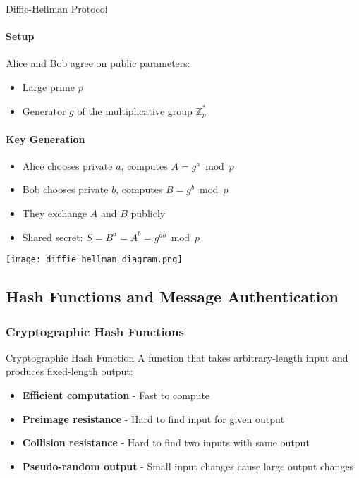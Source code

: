 \begin{KR}{Diffie-Hellman Protocol}
    \paragraph{Setup}
    Alice and Bob agree on public parameters:
    \begin{itemize}
        \item Large prime $p$
        \item Generator $g$ of the multiplicative group $\mathbb{Z}_p^*$
    \end{itemize}
    
    \paragraph{Key Generation}
    \begin{itemize}
        \item Alice chooses private $a$, computes $A = g^a \bmod p$
        \item Bob chooses private $b$, computes $B = g^b \bmod p$
        \item They exchange $A$ and $B$ publicly
        \item Shared secret: $S = B^a = A^b = g^{ab} \bmod p$
    \end{itemize}
    \texttt{[image: diffie\_hellman\_diagram.png]}
\end{KR}

\subsection{Hash Functions and Message Authentication}

\subsubsection{Cryptographic Hash Functions}

\begin{definition}{Cryptographic Hash Function}
    A function that takes arbitrary-length input and produces fixed-length output:
    \begin{itemize}
        \item \textbf{Efficient computation} - Fast to compute
        \item \textbf{Preimage resistance} - Hard to find input for given output
        \item \textbf{Collision resistance} - Hard to find two inputs with same output
        \item \textbf{Pseudo-random output} - Small input changes cause large output changes
    \end{itemize}
\end{definition}

